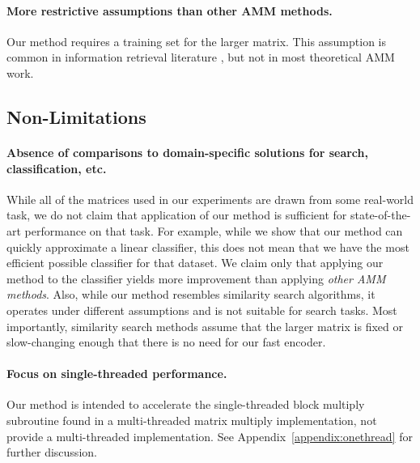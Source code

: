 \paragraph{More restrictive assumptions than other AMM methods.} Our method requires a training set for the larger matrix. This assumption is common in information retrieval literature \cite{bolt,pairq,quip}, but not in most theoretical AMM work.


\subsection{Non-Limitations}
\paragraph{Absence of comparisons to domain-specific solutions for search, classification, etc.} While all of the matrices used in our experiments are drawn from some real-world task, we do not claim that application of our method is sufficient for state-of-the-art performance on that task. For example, while we show that our method can quickly approximate a linear classifier, this does not mean that we have the most efficient possible classifier for that dataset. We claim only that applying our method to the classifier yields more improvement than applying \textit{other AMM methods}. Also, while our method resembles similarity search algorithms, it operates under different assumptions and is not suitable for search tasks. Most importantly, similarity search methods assume that the larger matrix is fixed or slow-changing enough that there is no need for our fast encoder.
\paragraph{Focus on single-threaded performance.}
Our method is intended to accelerate the single-threaded block multiply subroutine found in a multi-threaded matrix multiply implementation, not provide a multi-threaded implementation. See Appendix~\ref{appendix:onethread} for further discussion.



